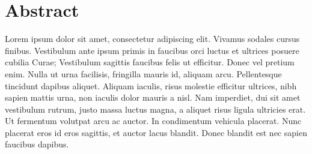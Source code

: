 \section*{Abstract}


Lorem ipsum dolor sit amet, consectetur adipiscing elit. Vivamus sodales cursus 
finibus. Vestibulum ante ipsum primis in faucibus orci luctus et ultrices posuere 
cubilia Curae; Vestibulum sagittis faucibus felis ut efficitur. Donec vel pretium 
enim. Nulla ut urna facilisis, fringilla mauris id, aliquam arcu. Pellentesque 
tincidunt dapibus aliquet. Aliquam iaculis, risus molestie efficitur ultrices, 
nibh sapien mattis urna, non iaculis dolor mauris a nisl. Nam imperdiet, dui sit 
amet vestibulum rutrum, justo massa luctus magna, a aliquet risus ligula ultricies 
erat. Ut fermentum volutpat arcu ac auctor. In condimentum vehicula placerat. Nunc 
placerat eros id eros sagittis, et auctor lacus blandit. Donec blandit est nec 
sapien faucibus dapibus.


